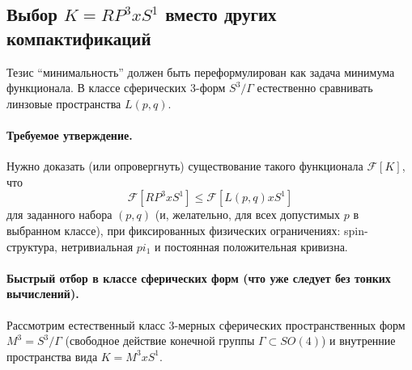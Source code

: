 \documentclass[12pt]{article}
\def\mathbb#1{#1}%
\def\pi{pi}%
\def\times{x}%
\begin{document}
\subsection{Выбор \texorpdfstring{$K=\mathbb{RP}^3\times S^1$}{K=RP3 x S1} вместо других компактификаций}
Тезис ``минимальность'' должен быть переформулирован как задача минимума функционала.
В классе сферических 3-форм $S^3/\Gamma$ естественно сравнивать линзовые пространства $L(p,q)$.

\paragraph{Требуемое утверждение.}
Нужно доказать (или опровергнуть) существование такого функционала $\mathcal{F}[K]$, что
\begin{equation}
\mathcal{F}[\mathbb{RP}^3\times S^1]\le \mathcal{F}[L(p,q)\times S^1]
\end{equation}
для заданного набора $(p,q)$ (и, желательно, для всех допустимых $p$ в выбранном классе), при фиксированных физических ограничениях: spin-структура, нетривиальная $\pi_1$ и постоянная положительная кривизна.


\paragraph{Быстрый отбор в классе сферических форм (что уже следует без тонких вычислений).}
Рассмотрим естественный класс 3-мерных сферических пространственных форм $M^3=S^3/\Gamma$ (свободное действие конечной группы $\Gamma\subset SO(4)$) и внутренние пространства вида $K=M^3\times S^1$.
\end{document}
